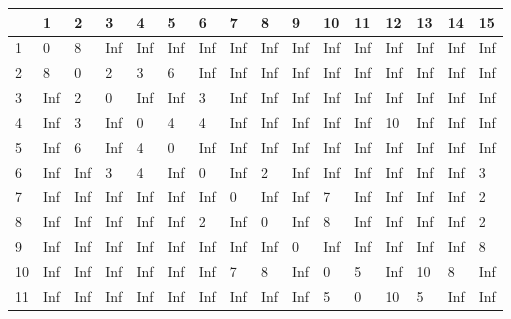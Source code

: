 \begin{table}[H]
\resizebox{12.5cm}{!} {
 
    \begin{tabular}{|l|lllllllllllllll|}
    \hline
    ~ & 1       & 2        &  3    &   4     &  5     &  6      & 7      &  8     & 9      & 10      & 11     & 12         &  13     & 14       &  15  \\
    \hline
    1 & 0       & 8        &  Inf    &   Inf     &  Inf     &  Inf      & Inf      &  Inf     & Inf      & Inf      & Inf     & Inf         &  Inf     & Inf       &  Inf  \\
    2 &8       & 0        & 2       &  3        &  6       &  Inf      & Inf      & Inf      & Inf      & Inf      & Inf     & Inf         &  Inf     &  Inf      &  Inf  \\
    3 & Inf     &  2       &  0      &  Inf      & Inf      &  3        &  Inf     &  Inf     & Inf      &  Inf     & Inf     &  Inf        &  Inf     &   Inf     & Inf   \\
    4 & Inf     &  3       &  Inf    &  0        & 4        & 4         & Inf      &  Inf     &  Inf     & Inf      & Inf     & 10          &  Inf     &  Inf      &  Inf  \\
    5 & Inf     &   6      &   Inf   &    4      &   0      & Inf       &  Inf     &  Inf     &   Inf    &   Inf    &    Inf  &     Inf     & Inf      & Inf       & Inf   \\
    6 & Inf     & Inf      &   3     & 4         &  Inf     &  0        &   Inf    &    2     & Inf      & Inf      & Inf     & Inf         & Inf      & Inf       & 3     \\
    7 & Inf     & Inf      &  Inf    &   Inf     &   Inf    &   Inf     & 0        & Inf      &  Inf     &  7       & Inf     & Inf         & Inf      & Inf       &  2    \\
    8 & Inf     & Inf      & Inf     & Inf       & Inf      & 2         & Inf      &  0       &  Inf     &  8       & Inf     &  Inf        &  Inf     & Inf       & 2     \\
    9 & Inf     &  Inf     & Inf     &   Inf     & Inf      & Inf       &  Inf     &  Inf     & 0        &  Inf     & Inf     & Inf         & Inf      & Inf       & 8     \\
    10 & Inf     &  Inf     & Inf     &  Inf      & Inf      &  Inf      & 7        &  8       &  Inf     &  0       & 5       & Inf         & 10       & 8         & Inf   \\
    11 & Inf     &  Inf     & Inf     & Inf       &  Inf     &  Inf      & Inf      & Inf      &  Inf     &   5      & 0       & 10          &  5       & Inf       & Inf   \\

\end{tabular}}
\end{table}
